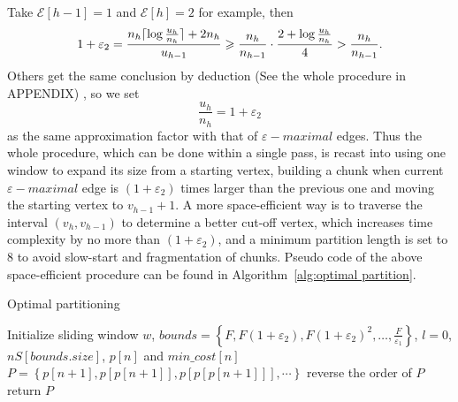 \documentclass[runningheads,a4paper]{llncs}
\begin{document}
Take $ \mathcal{E}[h-1]=1 $ and $ \mathcal{E}[h]=2 $ for example, then
\begin{displaymath}
\noindent
1+\varepsilon_{2}=\frac{n_{h}\lceil\log \frac{u_{h}}{n_{h}}\rceil+2n_{h}}{u_{h-1}}\geqslant \frac{n_{h}}{n_{h-1}}\cdot \frac{2+\log \frac{u_{h}}{n_{h}}}{4}>\frac{n_{h}}{n_{h-1}}.
\end{displaymath}
Others get the same conclusion by deduction (See the whole procedure in APPENDIX)
, so we set
\begin{equation}
\frac{u_{h}}{n_{h}}=1+\varepsilon_2
\end{equation}
as the same approximation factor with that of $\varepsilon-maximal$ edges.
Thus the whole procedure, which can be done within a single pass, is recast into using one window to expand its size from a starting vertex, building a chunk when current $\varepsilon-maximal$ edge is $\left(1+\varepsilon_{2}\right)$ times larger than the previous one and moving the starting vertex to $v_{h-1}+1$.
A more space-efficient way is to traverse the interval $\left(v_{h},v_{h-1}\right)$ to determine a better cut-off vertex, which increases time complexity by no more than $\left(1+\varepsilon_{2}\right)$, and a minimum partition length is set to 8 to avoid slow-start and fragmentation of chunks.
Pseudo code of the above space-efficient procedure can be found in Algorithm~\ref{alg:optimal partition}.

\begin{algorithm} \label{alg:optimal partition}
	\caption{Optimal partitioning}
	Initialize sliding window $ w $, $ bounds=\left\lbrace F,F(1+\varepsilon_2),F(1+\varepsilon_2)^2,\dots, \frac{F}{\varepsilon_1} \right\rbrace $, $ l=0 $, $ nS[bounds.size] $, $p\left[ n \right]$ and $min\_cost \left[n\right] $\;
	$ P=\left\lbrace p\left[n+1\right], p\left[p\left[n+1\right]\right], p\left[p\left[p\left[n+1\right]\right]\right],\cdots\right\rbrace $\;
	reverse the order of $ P $\;
	return $ P $\;
\end{algorithm}
\end{document}
